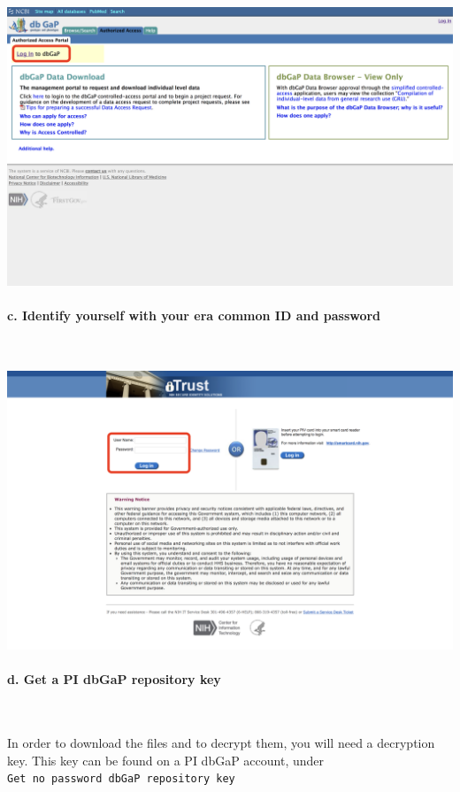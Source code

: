 \documentclass[11pt]{article}
\makeatletter
\def\maxwidth{\ifdim\Gin@nat@width>\linewidth\linewidth
    \else\Gin@nat@width\fi}
\let\Oldincludegraphics\includegraphics
\renewcommand{\includegraphics}[1]{\Oldincludegraphics[width=.8\maxwidth]{#1}}
\makeatother
\begin{document}
    \includegraphics{Screenshots/Screen2.png}

    \hypertarget{c.-identify-yourself-with-your-era-common-id-and-password}{%
\paragraph{c. Identify yourself with your era common ID and password}\label{c.-identify-yourself-with-your-era-common-id-and-password}}
\ 

  \includegraphics{Screenshots/Screen3.png}

    \hypertarget{d.-get-a-pi-dbgap-repository-key}{%
\paragraph{d. Get a PI dbGaP repository key}\label{d.-get-a-pi-dbgap-repository-key}}
\ 

In order to download the files and to decrypt them, you
will need a decryption key. This key can be found on a PI dbGaP account,
under \texttt{Get\ no\ password\ dbGaP\ repository\ key}
\end{document}
